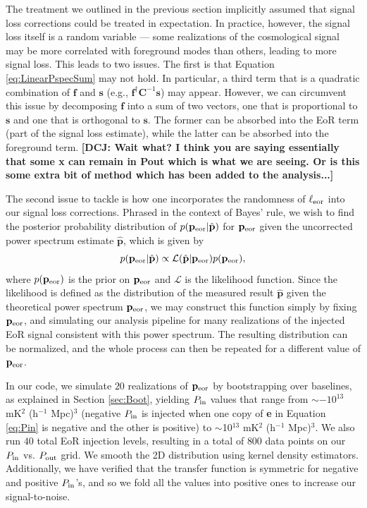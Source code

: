 \documentclass[preprint2,numberedappendix,tighten]{aastex6}  %
\newcommand{\f}{\mathbf{f}}
\newcommand{\s}{\mathbf{s}}
\newcommand{\p}{\mathbf{p}}
\newcommand{\phat}{\hat{\mathbf{p}}}
\newcommand{\C}{\mathbf{C}}
\newcommand{\dcj}[1]{{\color{orange} \textbf{[DCJ: #1]}}}
\begin{document}
The treatment we outlined in the previous section implicitly assumed that signal loss corrections could be treated in expectation. In practice, however, the signal loss itself is a random variable --- some realizations of the cosmological signal may be more correlated with foreground modes than others, leading to more signal loss. This leads to two issues. The first is that Equation \eqref{eq:LinearPspecSum} may not hold. In particular, a third term that is a quadratic combination of $\f$ and $\s$ (e.g., $\f^\dagger \C^{-1} \s$) may appear. However, we can circumvent this issue by decomposing $\f$ into a sum of two vectors, one that is proportional to $\s$ and one that is orthogonal to $\s$. The former can be absorbed into the EoR term (part of the signal loss estimate), while the latter can be absorbed into the foreground term. 
\dcj{Wait what? I think you are saying essentially that some x can remain in Pout which is what we are seeing. Or is this some extra bit of method which has been added to the analysis...}

The second issue to tackle is how one incorporates the randomness of $\ell_{\rm eor}$ into our signal loss corrections. Phrased in the context of Bayes' rule, we wish to find the posterior probability distribution of $p( \p_{\rm eor} | \phat)$ for $\p_{\rm eor}$ given the uncorrected power spectrum estimate $\phat$, which is given by
\begin{equation}
\label{eq:Bayes}
p( \p_{\rm eor} | \phat) \propto \mathcal{L} (  \phat | \p_{\rm eor})  p( \p_{\rm eor}),
\end{equation}
where $p( \p_{\rm eor})$ is the prior on $\p_{\rm eor}$ and $\mathcal{L} $ is the likelihood function. Since the likelihood is defined as the distribution of the measured result $ \phat$ given the theoretical power spectrum $\p_{\rm eor}$, we may construct this function simply by fixing $\p_{\rm eor}$, and simulating our analysis pipeline for many realizations of the injected EoR signal consistent with this power spectrum. The resulting distribution can be normalized, and the whole process can then be repeated for a different value of $\p_{\rm eor}$. 

In our code, we simulate $20$ realizations of $\p_{\rm eor}$ by bootstrapping over baselines, as explained in Section \ref{sec:Boot}, yielding $P_{\rm in}$ values that range from $\sim$$-10^{13}$ mK$^{2}$ (h$^{-1}$ Mpc)$^{3}$ (negative $P_{\rm in}$ is injected when one copy of \textbf{e} in Equation \eqref{eq:Pin} is negative and the other is positive) to $\sim$10$^{13}$ mK$^{2}$ (h$^{-1}$ Mpc)$^{3}$. We also run $40$ total EoR injection levels, resulting in a total of $800$ data points on our $P_{\rm in}$ vs. $P_{\rm out}$ grid. We smooth the 2D distribution using kernel density estimators. Additionally, we have verified that the transfer function is symmetric for negative and positive $P_{\rm in}$'s, and so we fold all the values into positive ones to increase our signal-to-noise.
\end{document}
